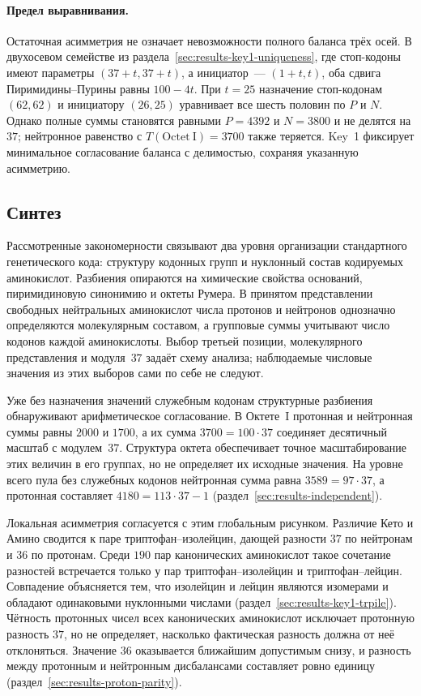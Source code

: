 \documentclass[11pt,a4paper]{article}
\renewcommand{\_}{\origunderscore\allowbreak}
\begin{document}
\paragraph{Предел выравнивания.}
Остаточная асимметрия не означает невозможности полного
баланса трёх осей. В двухосевом семействе из
раздела~\ref{sec:results-key1-uniqueness}, где стоп-кодоны
имеют параметры $(37+t,37+t)$, а инициатор~--- $(1+t,t)$,
оба сдвига Пиримидины--Пурины равны $100-4t$.
При $t=25$ назначение стоп-кодонам $(62,62)$ и
инициатору $(26,25)$ уравнивает все шесть половин
по $P$ и $N$. Однако полные суммы становятся равными
$P=4392$ и $N=3800$ и не делятся на $37$;
нейтронное равенство с $T(\mathrm{Octet~I})=3700$
также теряется. Key~1 фиксирует минимальное согласование
баланса с делимостью, сохраняя указанную асимметрию.

\subsection{Синтез}
\label{sec:results-synthesis}

Рассмотренные закономерности связывают два уровня организации
стандартного генетического кода: структуру кодонных групп и
нуклонный состав кодируемых аминокислот. Разбиения опираются на
химические свойства оснований, пиримидиновую синонимию и
октеты Румера. В принятом представлении свободных
нейтральных аминокислот числа протонов и нейтронов однозначно
определяются молекулярным составом, а групповые суммы учитывают
число кодонов каждой аминокислоты. Выбор третьей позиции,
молекулярного представления и модуля~$37$ задаёт схему анализа;
наблюдаемые числовые значения из этих выборов сами по себе
не следуют.

Уже без назначения значений служебным кодонам структурные
разбиения обнаруживают арифметическое согласование.
В Октете~I протонная и нейтронная суммы равны $2000$ и $1700$,
а их сумма $3700=100\cdot37$ соединяет десятичный масштаб
с модулем~$37$. Структура октета обеспечивает точное
масштабирование этих величин в его группах, но не определяет
их исходные значения. На уровне всего пула без служебных
кодонов нейтронная сумма равна $3589=97\cdot37$, а протонная
составляет $4180=113\cdot37-1$
(раздел~\ref{sec:results-independent}).

Локальная асимметрия согласуется с этим глобальным рисунком.
Различие Кето и Амино сводится к паре
триптофан--изолейцин, дающей разности $37$ по нейтронам
и $36$ по протонам. Среди $190$ пар канонических аминокислот такое сочетание разностей встречается только у пар триптофан--изолейцин и
триптофан--лейцин. Совпадение объясняется тем, что
изолейцин и лейцин являются изомерами и обладают
одинаковыми нуклонными числами
(раздел~\ref{sec:results-key1-trpile}).
Чётность протонных чисел всех канонических аминокислот
исключает протонную разность $37$, но не определяет,
насколько фактическая разность должна от неё отклоняться.
Значение $36$ оказывается ближайшим допустимым снизу,
и разность между протонным и нейтронным дисбалансами
составляет ровно единицу
(раздел~\ref{sec:results-proton-parity}).
\end{document}
